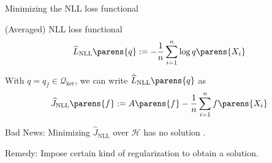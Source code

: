 \documentclass[aspectratio=169,xcolor=dvipsnames]{beamer}
\newcommand{\NLL}{\mathrm{NLL}}
\begin{document}
%	
%	
%	
%		
%	


%
%	



\begin{frame}{Minimizing the NLL loss functional}
	
	(Averaged) NLL loss functional 
	\begin{align}
		\widehat{L}_{\NLL} \parens{q} := - \frac{1}{n} \sum_{i=1}^n \log q \parens{X_i}
	\end{align}
	
	With $q = q_f \in \mathcal{Q}_{\mathrm{ker}}$, we can write $\widehat{L}_{\NLL} \parens{q}$ as 
	\begin{align}
		\widehat{J}_{\NLL} \parens{f} := A \parens{f} - \frac{1}{n} \sum_{i=1}^n f \parens{X_i}
	\end{align}
	
	{\color{defaultcolor} Bad News:} Minimizing $\widehat{J}_{\NLL}$ over $\mathcal{H}$ has {\color{red} no solution} \parencite{Fukumizu2009-uu}. 
	
	\vspace{5pt}
	
	{\color{defaultcolor} Remedy:} Impose certain kind of {\color{red} regularization} to obtain a solution. 
	
\end{frame}
\end{document}
